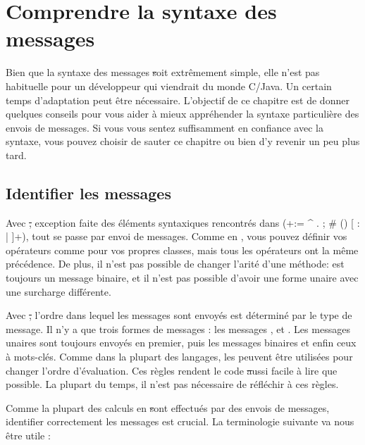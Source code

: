 \documentclass[a4paper,10pt,twoside]{book}
\begin{document}
	\renewcommand{\nnbb}[2]{} %
	\sloppy
\fi
\chapter{Comprendre la syntaxe des messages}

Bien que la syntaxe des messages \st soit extrêmement simple, elle n'est pas 
habituelle pour un développeur qui viendrait du monde C/Java. Un certain temps d'adaptation peut être nécessaire. L'objectif de ce chapitre est de donner quelques conseils pour vous aider à mieux appréhender la syntaxe particulière  des envois de messages.
Si vous vous sentez suffisamment en confiance avec la syntaxe, vous pouvez choisir de sauter 
ce chapitre ou bien d'y revenir un peu plus tard.

\section{Identifier les messages}

Avec \st, exception faite des éléments syntaxiques rencontrés dans
 (\ct+:= ^ . ; # () {} [ : | ]+), tout se passe par envoi de messages.
Comme en , vous pouvez définir vos opérateurs comme \ct{+} pour vos propres 
classes, mais tous les opérateurs ont la même précédence.
De plus, il n'est pas possible de changer l'arité d'une méthode:
\ct{-} est toujours un message binaire, et il n'est pas possible
d'avoir une forme unaire avec une surcharge différente.

Avec \st, l'ordre dans lequel les messages sont envoyés est
déterminé par le type de message. Il n'y a que trois formes de
messages : les messages ,
 et .
 Les messages unaires sont toujours envoyés en premier, puis
les messages binaires et enfin ceux à mots-clés. Comme dans la
plupart des langages,  les  peuvent être utilisées 
pour changer l'ordre d'évaluation. Ces règles rendent le code \st 
aussi facile à lire que possible. La plupart du temps, il n'est pas 
nécessaire de réfléchir à ces règles.

Comme la plupart des calculs en \st sont effectués par des envois de 
messages, identifier correctement les messages est crucial. La terminologie 
suivante va nous être utile :
\end{document}
